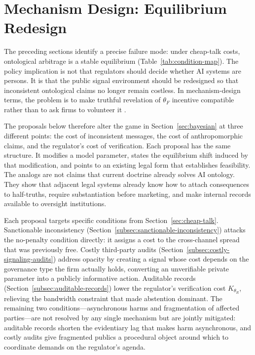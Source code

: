 \section{Mechanism Design: Equilibrium Redesign}
\label{sec:mechanism}

The preceding sections identify a precise failure mode: under cheap-talk costs, ontological arbitrage is a stable equilibrium (Table~\ref{tab:condition-map}). The policy implication is not that regulators should decide whether AI systems
are persons. It is that the public signal environment should be redesigned so
that inconsistent ontological claims no longer remain costless. In
mechanism-design terms, the problem is to make truthful revelation of $\theta_F$ incentive
compatible rather than to ask firms to volunteer it \citep{myerson1979}.

The proposals below therefore alter the game in Section~\ref{sec:bayesian} at
three different points: the cost of inconsistent messages, the cost of
anthropomorphic claims, and the regulator's cost of verification. Each proposal
has the same structure. It modifies a model parameter, states the equilibrium
shift induced by that modification, and points to an existing legal form that
establishes feasibility. The analogs are not claims that current doctrine already
solves AI ontology. They show that adjacent legal systems already know how to
attach consequences to half-truths, require substantiation before marketing, and
make internal records available to oversight institutions.

Each proposal targets specific conditions from
Section~\ref{sec:cheap-talk}. Sanctionable inconsistency
(Section~\ref{subsec:sanctionable-inconsistency}) attacks the no-penalty
condition directly: it assigns a cost to the cross-channel spread that was
previously free. Costly third-party audits
(Section~\ref{subsec:costly-signaling-audits}) address opacity by creating a
signal whose cost depends on the governance type the firm actually holds,
converting an unverifiable private parameter into a publicly informative action.
Auditable records (Section~\ref{subsec:auditable-records}) lower the
regulator's verification cost $K_{\theta_R}$, relieving the bandwidth
constraint that made abstention dominant. The remaining two
conditions---asynchronous harms and fragmentation of affected
parties---are not resolved by any single mechanism but are jointly mitigated:
auditable records shorten the evidentiary lag that makes harm asynchronous, and
costly audits give fragmented publics a procedural object around which to
coordinate demands on the regulator's agenda.

